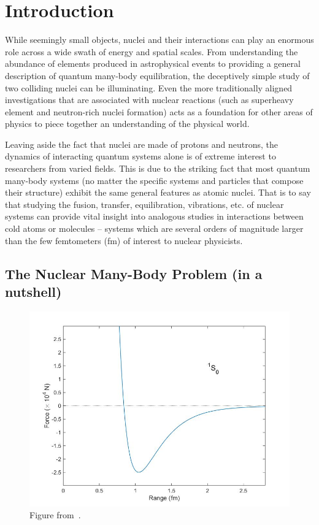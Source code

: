 
\chapter{Introduction}\label{chapters:Introduction}
\vspace{-7mm}

While seemingly small objects, nuclei and their interactions can play an enormous role across a wide swath of energy and spatial scales.
From understanding the abundance of elements produced in astrophysical events to providing a general description of quantum many-body equilibration, the deceptively simple study of two colliding nuclei can be illuminating.
Even the more traditionally aligned investigations that are associated with nuclear reactions (such as superheavy element and neutron-rich nuclei formation) acts as a foundation for other areas of physics to piece together an understanding of the physical world.

Leaving aside the fact that nuclei are made of protons and neutrons, the dynamics of interacting quantum systems alone is of extreme interest to researchers from varied fields.
This is due to the striking fact that most quantum many-body systems (no matter the specific systems and particles that compose their structure) exhibit the same general features as atomic nuclei.
That is to say that studying the fusion, transfer, equilibration, vibrations, etc. of nuclear systems can provide vital insight into analogous studies in interactions between cold atoms or molecules -- systems which are several orders of magnitude larger than the few femtometers (fm) of interest to nuclear physicists.

\section{The Nuclear Many-Body Problem (in a nutshell)}

\begin{figure}
	\includegraphics[width=\textwidth]{../Figures/intro_figs/ReidForce2.jpg}
	\caption{\citep{reid1968} Figure from~\citep{bdushaw}.}
\end{figure}

